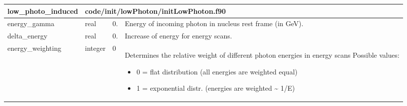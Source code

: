 \documentclass{article}
\begin{document}
\begin{longtable}{llll}
\toprule
\textbf{\large{low\_photo\_induced}} & \multicolumn{3}{l}{\footnotesize{code/init/lowPhoton/initLowPhoton.f90}}\\*
\midrule
\endfirsthead
\midrule
\endhead
energy\_gamma & \begin{minipage}[t]{2cm}real\end{minipage} & \begin{minipage}[t]{2cm}0.\end{minipage} & \begin{minipage}[t]{12cm}Energy of incoming photon in nucleus rest frame (in GeV).\end{minipage}\\*
\midrule
delta\_energy & \begin{minipage}[t]{2cm}real\end{minipage} & \begin{minipage}[t]{2cm}0.\end{minipage} & \begin{minipage}[t]{12cm}Increase of energy for energy scans.\end{minipage}\\*
\midrule
energy\_weighting & \begin{minipage}[t]{2cm}integer\end{minipage} & \begin{minipage}[t]{2cm}0\end{minipage} & \begin{minipage}[t]{12cm}Determines the relative weight of different photon energies in energy scans Possible values:\begin{itemize}\leftmargin0em\itemindent0pt\item 0 = flat distribution (all energies are weighted equal)\item 1 = exponential distr. (energies are weighted \~{} 1/E)\end{itemize}\end{minipage}\\*
\bottomrule
\end{longtable}
{ }



\end{document}
